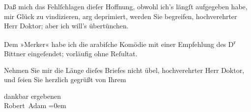 \pstart
           Daß mich das Fehlſchlagen dieſer Hoffnung, obwohl ich’s längſt aufgegeben habe, mir
               Glück zu vindizieren, arg deprimiert, werden Sie begreifen, hochverehrter Herr
               Doktor; aber ich will’s übertünchen.\pend
           
\pstart
           Dem »Merker« habe ich die arabiſche Komödie mit einer Empfehlung des D\textsuperscript{r}{ }Bittner eingeſendet; vorläufig ohne
               Reſultat.\pend
           
\pstart
           Nehmen Sie mir die Länge dieſes Briefes nicht übel, hochverehrter Herr Doktor, und{ }ſeien Sie herzlich gegrüßt von Ihrem\pend
           
\pstart
           dankbar ergebenen{\\[\baselineskip]}\spacefill\mbox{Robert Adam}\pend
           \leftskip=0em{}\endnumbering{}  \newcommand{\dateiname}{L02002}\newcommand{\titel}{Robert Adam an Arthur Schnitzler, 3. 2. 1911}\newcommand{\editorInnen}{Martin Anton Müller und Gerd-Hermann Susen}
